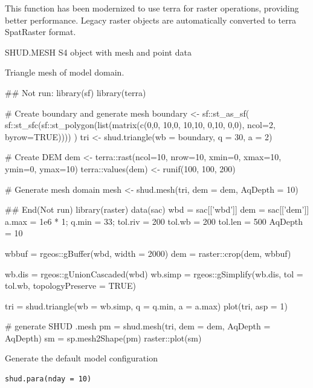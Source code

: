 \documentclass[a4paper]{book}
\begin{document}
%
\begin{Details}\relax
This function has been modernized to use terra for raster operations,
providing better performance. Legacy raster objects are automatically
converted to terra SpatRaster format.
\end{Details}
%
\begin{Value}
SHUD.MESH S4 object with mesh and point data

Triangle mesh of model domain.
\end{Value}
%
\begin{Examples}
\begin{ExampleCode}
## Not run: 
library(sf)
library(terra)

# Create boundary and generate mesh
boundary <- sf::st_as_sf(
  sf::st_sfc(sf::st_polygon(list(matrix(c(0,0, 10,0, 10,10, 0,10, 0,0),
                                         ncol=2, byrow=TRUE))))
)
tri <- shud.triangle(wb = boundary, q = 30, a = 2)

# Create DEM
dem <- terra::rast(ncol=10, nrow=10, xmin=0, xmax=10, ymin=0, ymax=10)
terra::values(dem) <- runif(100, 100, 200)

# Generate mesh domain
mesh <- shud.mesh(tri, dem = dem, AqDepth = 10)

## End(Not run)
library(raster)
data(sac)
wbd = sac[['wbd']]
dem = sac[['dem']]
a.max = 1e6 * 1;
q.min = 33;
tol.riv = 200
tol.wb = 200
tol.len = 500
AqDepth = 10

wbbuf = rgeos::gBuffer(wbd, width = 2000)
dem = raster::crop(dem, wbbuf)

wb.dis = rgeos::gUnionCascaded(wbd)
wb.simp = rgeos::gSimplify(wb.dis, tol = tol.wb, topologyPreserve = TRUE)


tri = shud.triangle(wb = wb.simp, q = q.min, a = a.max)
plot(tri, asp = 1)

# generate SHUD .mesh
pm = shud.mesh(tri, dem = dem, AqDepth = AqDepth)
sm = sp.mesh2Shape(pm)
raster::plot(sm)
\end{ExampleCode}
\end{Examples}
%
\begin{Description}\relax
Generate the default model configuration
\end{Description}
%
\begin{Usage}
\begin{verbatim}
shud.para(nday = 10)
\end{verbatim}
\end{Usage}
\end{document}
